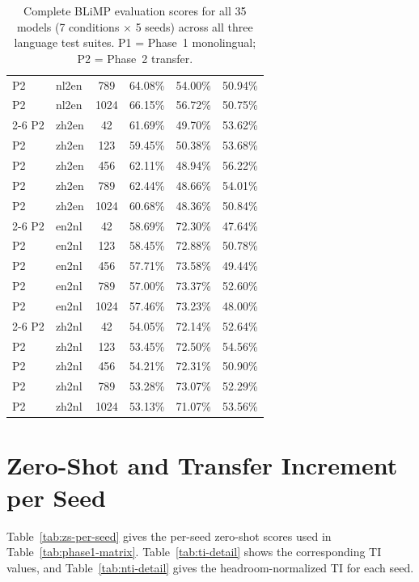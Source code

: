 \documentclass[11pt]{article}
\begin{document}
\begin{table}[H]
{\begin{tabular}{llcccc}
P2 & nl2en & 789  & 64.08\% & 54.00\% & 50.94\% \\
P2 & nl2en & 1024 & 66.15\% & 56.72\% & 50.75\% \\ \cline{2-6}
P2 & zh2en & 42   & 61.69\% & 49.70\% & 53.62\% \\
P2 & zh2en & 123  & 59.45\% & 50.38\% & 53.68\% \\
P2 & zh2en & 456  & 62.11\% & 48.94\% & 56.22\% \\
P2 & zh2en & 789  & 62.44\% & 48.66\% & 54.01\% \\
P2 & zh2en & 1024 & 60.68\% & 48.36\% & 50.84\% \\ \cline{2-6}
P2 & en2nl & 42   & 58.69\% & 72.30\% & 47.64\% \\
P2 & en2nl & 123  & 58.45\% & 72.88\% & 50.78\% \\
P2 & en2nl & 456  & 57.71\% & 73.58\% & 49.44\% \\
P2 & en2nl & 789  & 57.00\% & 73.37\% & 52.60\% \\
P2 & en2nl & 1024 & 57.46\% & 73.23\% & 48.00\% \\ \cline{2-6}
P2 & zh2nl & 42   & 54.05\% & 72.14\% & 52.64\% \\
P2 & zh2nl & 123  & 53.45\% & 72.50\% & 54.56\% \\
P2 & zh2nl & 456  & 54.21\% & 72.31\% & 50.90\% \\
P2 & zh2nl & 789  & 53.28\% & 73.07\% & 52.29\% \\
P2 & zh2nl & 1024 & 53.13\% & 71.07\% & 53.56\% \\ \hline
\end{tabular}
}
\caption{Complete BLiMP evaluation scores for all 35 models (7 conditions $\times$ 5 seeds) across all three language test suites. P1 = Phase~1 monolingual; P2 = Phase~2 transfer.}
\label{tab:all-scores}
\end{table}

\section{Zero-Shot and Transfer Increment per Seed}
\label{sec:appendix-ti}

Table~\ref{tab:zs-per-seed} gives the per-seed zero-shot scores used in Table~\ref{tab:phase1-matrix}. Table~\ref{tab:ti-detail} shows the corresponding TI values, and Table~\ref{tab:nti-detail} gives the headroom-normalized TI for each seed.
\end{document}
